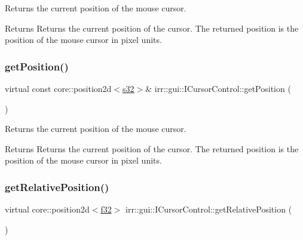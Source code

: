 Returns the current position of the mouse cursor. 

\begin{DoxyReturn}{Returns}
Returns the current position of the cursor. The returned position is the position of the mouse cursor in pixel units. 
\end{DoxyReturn}
\mbox{\label{classirr_1_1gui_1_1ICursorControl_a65d9f6e734baa02be69b7e9f5fbdd565}} 
\subsubsection{\texorpdfstring{get\+Position()}{getPosition()}\hspace{0.1cm}{\footnotesize\ttfamily [2/2]}}
{\footnotesize\ttfamily virtual const core\+::position2d$<$\hyperlink{namespaceirr_ac66849b7a6ed16e30ebede579f9b47c6}{s32}$>$\& irr\+::gui\+::\+I\+Cursor\+Control\+::get\+Position (\begin{DoxyParamCaption}{ }\end{DoxyParamCaption})\hspace{0.3cm}{\ttfamily [pure virtual]}}



Returns the current position of the mouse cursor. 

\begin{DoxyReturn}{Returns}
Returns the current position of the cursor. The returned position is the position of the mouse cursor in pixel units. 
\end{DoxyReturn}
\mbox{\label{classirr_1_1gui_1_1ICursorControl_a8ba1cb0ff11edc5fb32cdadddece09f8}} 
\subsubsection{\texorpdfstring{get\+Relative\+Position()}{getRelativePosition()}\hspace{0.1cm}{\footnotesize\ttfamily [1/2]}}
{\footnotesize\ttfamily virtual core\+::position2d$<$\hyperlink{namespaceirr_a0277be98d67dc26ff93b1a6a1d086b07}{f32}$>$ irr\+::gui\+::\+I\+Cursor\+Control\+::get\+Relative\+Position (\begin{DoxyParamCaption}{ }\end{DoxyParamCaption})\hspace{0.3cm}{\ttfamily [pure virtual]}}




